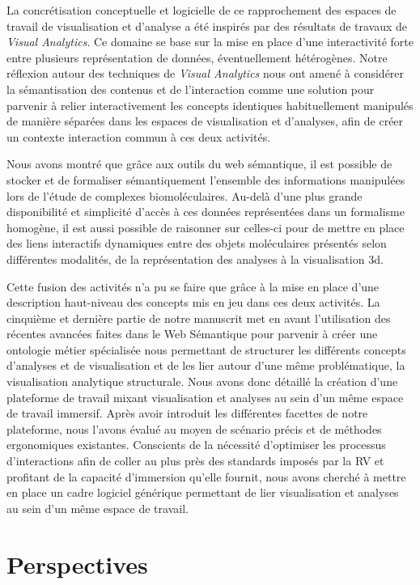 La concrétisation conceptuelle et logicielle de ce rapprochement des espaces de travail de visualisation et d'analyse a été inspirés par des résultats de travaux de \textit{Visual Analytics}. Ce domaine se base sur la mise en place d'une interactivité forte entre plusieurs représentation de données, éventuellement hétérogènes. Notre réflexion autour des techniques de \textit{Visual Analytics} nous ont amené à considérer la sémantisation des contenus et de l'interaction comme une solution pour parvenir à relier interactivement les concepts identiques habituellement manipulés de manière séparées dans les espaces de visualisation et d'analyses, afin de créer un contexte interaction commun à ces deux activités.

Nous avons montré que grâce aux outils du web sémantique, il est possible de stocker et de formaliser sémantiquement l'ensemble des informations manipulées lors de l'étude de complexes biomoléculaires. Au-delà d'une plus grande disponibilité et simplicité d'accès à ces données représentées dans un formalisme homogène, il est aussi possible de raisonner sur celles-ci pour de mettre en place des liens interactifs dynamiques entre des objets moléculaires présentés selon différentes modalités, de la représentation des analyses à la visualisation 3d.

Cette fusion des activités n'a pu se faire que grâce à la mise en place d'une description haut-niveau des concepts mis en jeu dans ces deux activités. La cinquième et dernière partie de notre manuscrit met en avant l'utilisation des récentes avancées faites dans le Web Sémantique pour parvenir à créer une ontologie métier spécialisée nous permettant de structurer les différents concepts d'analyses et de visualisation et de les lier autour d'une même problématique, la visualisation analytique structurale. Nous avons donc détaillé la création d'une plateforme de travail mixant visualisation et analyses au sein d'un même espace de travail immersif. Après avoir introduit les différentes facettes de notre plateforme, nous l'avons évalué au moyen de scénario précis et de méthodes ergonomiques existantes. Conscients de la nécessité d'optimiser les processus d'interactions afin de coller au plus près des standards imposés par la RV et profitant de la capacité d'immersion qu'elle fournit, nous avons cherché à mettre en place un cadre logiciel générique permettant de lier visualisation et analyses au sein d'un même espace de travail.


\section*{Perspectives}

